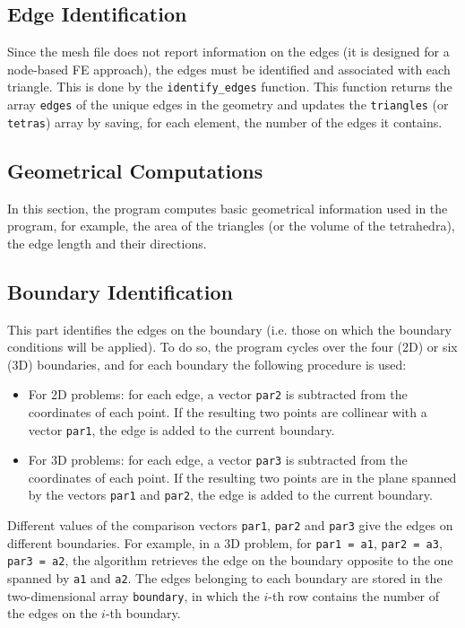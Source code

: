 \documentclass[11pt,a4paper,oneside]{article}
\begin{document}
\subsection{Edge Identification}
Since the mesh file does not report information on the edges (it is designed for a node-based FE approach), the edges must be identified and associated with each triangle. This is done by the {\tt identify\_edges} function. This function returns the array {\tt edges} of the unique edges in the geometry and updates the {\tt triangles} (or {\tt tetras}) array by saving, for each element, the number of the edges it contains.

\subsection{Geometrical Computations}
In this section, the program computes basic geometrical information used in the program, for example, the area of the triangles (or the volume of the tetrahedra), the edge length and their directions.

\subsection{Boundary Identification}
This part identifies the edges on the boundary (i.e. those on which the boundary conditions will be applied). To do so, the program cycles over the four (2D) or six (3D) boundaries, and for each boundary the following procedure is used:
\begin{itemize}
\item For 2D problems: for each edge, a vector {\tt par2} is subtracted from the coordinates of each point. If the resulting two points are collinear with a vector {\tt par1}, the edge is added to the current boundary.
\item For 3D problems: for each edge, a vector {\tt par3} is subtracted from the coordinates of each point. If the resulting two points are in the plane spanned by the vectors {\tt par1} and {\tt par2}, the edge is added to the current boundary.
\end{itemize}
Different values of the comparison vectors {\tt par1}, {\tt par2} and {\tt par3} give the edges on different boundaries. For example, in a 3D problem, for {\tt par1 = a1}, {\tt par2 = a3}, {\tt par3 = a2}, the algorithm retrieves the edge on the boundary opposite to the one spanned by {\tt a1} and {\tt a2}. The edges belonging to each boundary are stored in the two-dimensional array {\tt boundary}, in which the $i$-th row contains the number of the edges on the $i$-th boundary.
\end{document}
